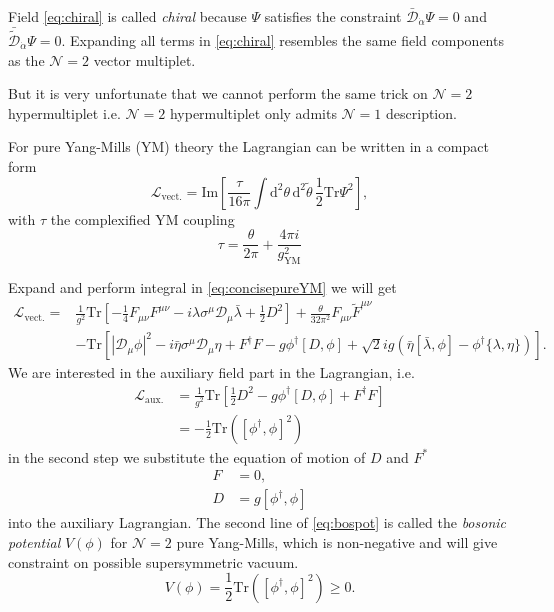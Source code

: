 \documentclass{article}
\begin{document}
Field \eqref{eq:chiral} is called \emph{chiral} because $\Psi$ satisfies the constraint $\bar{\mathcal{D}}_{\dot{\alpha}} \Psi=0$ and $\bar{\tilde{\mathcal{D}}}_{\dot{\alpha}} \Psi=0$. Expanding all terms in \eqref{eq:chiral} resembles the same field components as the $\mathcal{N}=2$ vector multiplet.

But it is very unfortunate that we cannot perform the same trick on $\mathcal{N}=2$ hypermultiplet i.e. $\mathcal{N}=2$ hypermultiplet only admits $\mathcal{N}=1$ description.

For pure Yang-Mills (YM) theory the Lagrangian can be written in a compact form
\begin{equation}
\label{eq:concisepureYM}
\mathcal{L}_{\mathrm{vect.}}=\mathrm{Im}\left[\frac{\tau}{16 \pi}  \int \mathrm{d}^{2} \theta\,\mathrm{d}^{2}\tilde{\theta}\,\frac{1}{2} \mathrm{Tr} \Psi^{2}\right],
\end{equation}
with $\tau$ the complexified YM coupling
\begin{equation}
\tau=\frac{\theta}{2\pi}+\frac{4\pi i}{g_{\mathrm{YM}}^2}
\end{equation}

Expand and perform integral in \eqref{eq:concisepureYM} we will get
\begin{equation}
\begin{aligned}
\mathcal{L}_{\mathrm{vect.}}=& \frac{1}{g^{2}} \mathrm{Tr}\left[-\frac{1}{4} F_{\mu \nu} F^{\mu \nu}-i \lambda \sigma^{\mu} \mathcal{D}_{\mu} \bar{\lambda}+\frac{1}{2}D^2\right]+\frac{\theta}{32 \pi^{2}} F_{\mu \nu} \tilde{F}^{\mu \nu}\\
&-\mathrm{Tr}\left[|\mathcal{D}_\mu\phi|^2-i\bar{\eta}\sigma^{\mu} \mathcal{D}_{\mu}\eta+F^\dagger F-g\phi^\dagger [D,\phi]+\sqrt{2}ig\left(\bar{\eta}[\bar{\lambda},\phi]-\phi^\dagger\{\lambda,\eta\}\right)\right].
\end{aligned}
\end{equation}
We are interested in the auxiliary field part in the Lagrangian, i.e.
\begin{equation}
\begin{aligned}
\label{eq:bospot}
\mathcal{L}_{\mathrm{aux.}}&=\frac{1}{g^{2}} \mathrm{Tr}\left[\frac{1}{2}D^2-g\phi^\dagger[D,\phi]+F^\dagger F\right]\\
&=-\frac{1}{2} \mathrm{Tr}\left([\phi^\dagger,\phi]^2\right)
\end{aligned}
\end{equation}
in the second step we substitute the equation of motion of $D$ and $F^*$ 
\begin{align}
\label{eq:aux1}
F&=0,\\
\label{eq:aux2}
D&=g[\phi^\dagger,\phi]
\end{align}
into the auxiliary Lagrangian. The second line of \eqref{eq:bospot} is called the \textit{bosonic potential} $V(\phi)$ for $\mathcal{N}=2$ pure Yang-Mills, which is non-negative and will give constraint on possible supersymmetric vacuum.
\begin{equation}
V(\phi)=\frac{1}{2} \mathrm{Tr}\left([\phi^\dagger,\phi]^2\right)\geq 0.
\end{equation}
\end{document}
